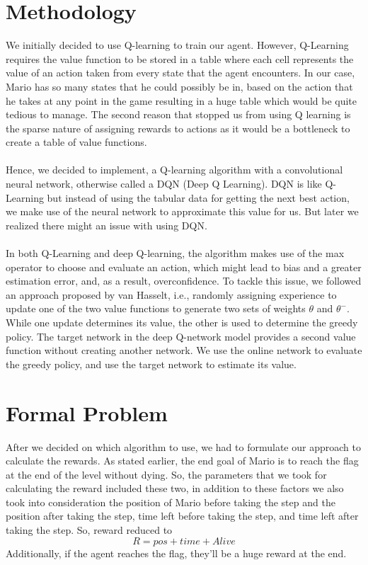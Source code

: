 \documentclass[conference]{IEEEtran}
\theoremstyle{definition}
\begin{document}
\section{Methodology}
 We initially decided to use Q-learning\cite{sutton1998reinforcement} to train our agent. However, Q-Learning requires the value function to be stored in a table where each cell represents the value of an action taken from every state that the agent encounters. In our case, Mario has so many states that he could possibly be in, based on the action that he takes at any point in the game resulting in a huge table which would be quite tedious to manage. The second reason that stopped us from using Q learning is the sparse nature of assigning rewards to actions as it would be a bottleneck to create a table of value functions.
\\
\\
Hence, we decided to implement, a Q-learning algorithm with a convolutional neural network, otherwise called a DQN (Deep Q Learning). DQN is like Q-Learning but instead of using the tabular data for getting the next best action, we make use of the neural network to approximate this value for us. But later we realized there might an issue with using DQN.
\\
\\
In both Q-Learning and deep Q-learning, the algorithm makes use of the max operator to choose and evaluate an action, which might lead to bias and a greater estimation error, and, as a result, overconfidence. To tackle this issue, we followed an approach proposed by van Hasselt\cite{van2016deep}, i.e., randomly assigning experience to update one of the two value functions to generate two sets of weights $\theta$ and $\theta^-$. While one update determines its value, the other is used to determine the greedy policy. The target network in the deep Q-network model provides a second value function without creating another network. We use the online network to evaluate the greedy policy, and use the target network to estimate its value.

\section{Formal Problem}
After we decided on which algorithm to use, we had to formulate our approach to calculate the rewards. As stated earlier, the end goal of Mario is to reach the flag at the end of the level without dying. So, the parameters that we took for calculating the reward included these two, in addition to these factors we also took into consideration the position of Mario before taking the step and the position after taking the step, time left before taking the step, and time left after taking the step. So, reward reduced to 
\[ R = pos + time + Alive\]
Additionally, if the agent reaches the flag, they’ll be a huge reward at the end.
\end{document}
